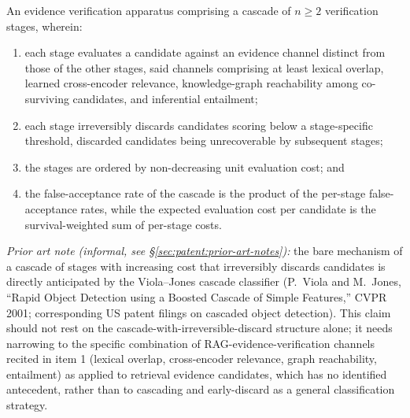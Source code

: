 \begin{claim}
\label{claim:proofreading}
An evidence verification apparatus comprising a cascade of $n \geq 2$ verification stages, wherein:
\begin{enumerate}
  \item each stage evaluates a candidate against an evidence channel distinct from those of the other stages, said channels comprising at least lexical overlap, learned cross-encoder relevance, knowledge-graph reachability among co-surviving candidates, and inferential entailment;
  \item each stage irreversibly discards candidates scoring below a stage-specific threshold, discarded candidates being unrecoverable by subsequent stages;
  \item the stages are ordered by non-decreasing unit evaluation cost; and
  \item the false-acceptance rate of the cascade is the product of the per-stage false-acceptance rates, while the expected evaluation cost per candidate is the survival-weighted sum of per-stage costs.
\end{enumerate}
\end{claim}

\par\noindent\emph{Prior art note (informal, see \S\ref{sec:patent:prior-art-notes}):} the bare mechanism of a cascade of stages with increasing cost that irreversibly discards candidates is directly anticipated by the Viola--Jones cascade classifier (P.\ Viola and M.\ Jones, ``Rapid Object Detection using a Boosted Cascade of Simple Features,'' CVPR 2001; corresponding US patent filings on cascaded object detection). This claim should not rest on the cascade-with-irreversible-discard structure alone; it needs narrowing to the specific combination of RAG-evidence-verification channels recited in item 1 (lexical overlap, cross-encoder relevance, graph reachability, entailment) as applied to retrieval evidence candidates, which has no identified antecedent, rather than to cascading and early-discard as a general classification strategy.

